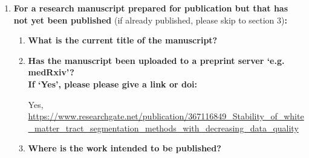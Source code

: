 {\begin{enumerate}[leftmargin=*,label={\bfseries\arabic*.}]
\begin{enumerate}[label={\alph*)}]
	\item \textbf{Where was the work published?}

	\item \textbf{Who published the work?}

	\item \textbf{When was the work published?}

	\item \textbf{List the manuscript's authors in the order they appear on the publication:}

	\item \textbf{Was the work peer reviewd?}

	\item \textbf{Have you retained the copyright?}

	\item \textbf{Was an earlier form of the manuscript uploaded to a preprint server (e.g. medRxiv)? If ‘Yes’, please give a link or doi}
	\\
	If ‘No’, please seek permission from the relevant publisher and check the box next to the below statement:
\begin{itemize}\itemsep0em
\item[$\Box$] {\itshape I acknowledge permission of the publisher named under 1d to include in this thesis portions of the publication named as included in 1c.}
\end{itemize}
%
\end{enumerate}
%
\item \textbf{For a research manuscript prepared for publication but that has not yet been published} (if already published, please skip to section 3)\textbf{:}
%
\begin{enumerate}[label={\alph*)}]\itemsep0em
	\item \textbf{What is the current title of the manuscript?}

	\item \textbf{Has the manuscript been uploaded to a preprint server `e.g. medRxiv'?
	\\
	If `Yes', please please give a link or doi:}

	Yes, \url{https://www.researchgate.net/publication/367116849_Stability_of_white_matter_tract_segmentation_methods_with_decreasing_data_quality}
	\item \textbf{Where is the work intended to be published?}


\end{enumerate}
\end{enumerate}}
